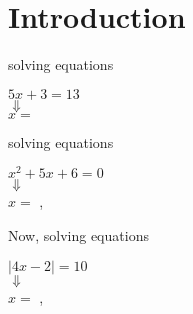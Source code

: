 \section{Introduction}

\begin{tcbraster}[
    raster equal height, 
    raster columns = 3,
    raster column skip = 0.5in,
]
    \begin{tcolorbox}[colback=white,boxrule=0.5pt,]
        \raggedright
        {\small solving  equations \phantom{xxxxxxx}}
        \begin{center}
        $5x +3 = 13$\\[0.25\baselineskip]
        {\HUGE$\Downarrow$}\\
        $x =$ 
        \end{center}
    \end{tcolorbox}
    \begin{tcolorbox}[colback=white,boxrule=0.5pt,]
        \raggedright
        {\small solving  equations}
        \begin{center}
        $x^2 + 5x + 6 = 0$\\[0.25\baselineskip]
        {\HUGE$\Downarrow$}\\[0.2\baselineskip]
        $x =$ , 
        \end{center}
    \end{tcolorbox}
    \begin{tcolorbox}[colback=white,boxrule=0.5pt,]
        \raggedright
        {\small Now, solving  equations}
        \begin{center}
        $|4x -2 | = 10$\\[0.25\baselineskip]
        {\HUGE$\Downarrow$}\\[0.2\baselineskip]
        $x =$ , 
        \end{center}
    \end{tcolorbox}
\end{tcbraster}

